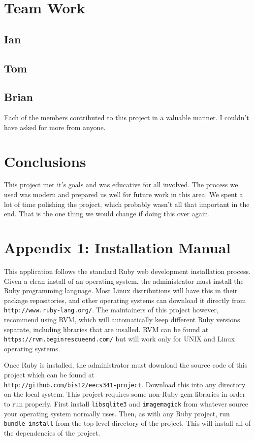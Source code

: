 \documentclass{acm_proc_article-sp}
\begin{document}
\section{Team Work}
\subsection{Ian}
\subsection{Tom}
\subsection{Brian}
Each of the members contributed to this project in a valuable manner.  I couldn't have asked for more from anyone.
\section{Conclusions}
This project met it's goals and was educative for all involved.  The process we used was modern and prepared us well for future work in this area.  We spent a lot of time polishing the project, which probably wasn't all that important in the end.  That is the one thing we would change if doing this over again.
\section{Appendix 1: Installation Manual}
This application follows the standard Ruby web development installation process.  Given a clean install of an operating system, the administrator must install the Ruby programming language. Most Linux distributions will have this in their package repositories, and other operating systems can download it directly from \texttt{http://www.ruby-lang.org/}.  The maintainers of this project however, recommend using RVM, which will automatically keep different Ruby versions separate, including libraries that are insalled. RVM can be found at \texttt{https://rvm.beginrescueend.com/} but will work only for UNIX and Linux operating systems.  

Once Ruby is installed, the administrator must download the source code of this project which can be found at \\\texttt{http://github.com/bis12/eecs341-project}.  Download this into any directory on the local system.  This project requires some non-Ruby gem libraries in order to run properly.  First install \texttt{libsqlite3} and \texttt{imagemagick} from whatever source your operating system normally uses. Then, as with any Ruby project, run \texttt{bundle install} from the top level directory of the project. This will install all of the dependencies of the project.
\end{document}
